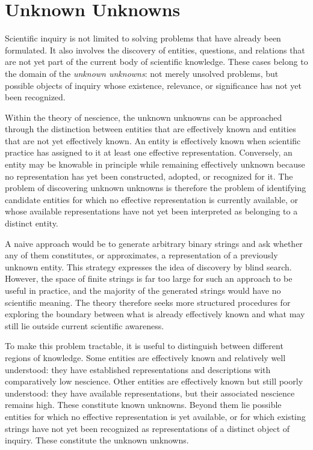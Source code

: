 %
%

\section{Unknown Unknowns}
\label{sec:intro_unknown_unknown}

Scientific inquiry is not limited to solving problems that have already been formulated. It also involves the discovery of entities, questions, and relations that are not yet part of the current body of scientific knowledge. These cases belong to the domain of the \emph{unknown unknowns}: not merely unsolved problems, but possible objects of inquiry whose existence, relevance, or significance has not yet been recognized.

Within the theory of nescience, the unknown unknowns can be approached through the distinction between entities that are effectively known and entities that are not yet effectively known. An entity is effectively known when scientific practice has assigned to it at least one effective representation. Conversely, an entity may be knowable in principle while remaining effectively unknown because no representation has yet been constructed, adopted, or recognized for it. The problem of discovering unknown unknowns is therefore the problem of identifying candidate entities for which no effective representation is currently available, or whose available representations have not yet been interpreted as belonging to a distinct entity.

A naive approach would be to generate arbitrary binary strings and ask whether any of them constitutes, or approximates, a representation of a previously unknown entity. This strategy expresses the idea of discovery by blind search. However, the space of finite strings is far too large for such an approach to be useful in practice, and the majority of the generated strings would have no scientific meaning. The theory therefore seeks more structured procedures for exploring the boundary between what is already effectively known and what may still lie outside current scientific awareness.

To make this problem tractable, it is useful to distinguish between different regions of knowledge. Some entities are effectively known and relatively well understood: they have established representations and descriptions with comparatively low nescience. Other entities are effectively known but still poorly understood: they have available representations, but their associated nescience remains high. These constitute known unknowns. Beyond them lie possible entities for which no effective representation is yet available, or for which existing strings have not yet been recognized as representations of a distinct object of inquiry. These constitute the unknown unknowns.

